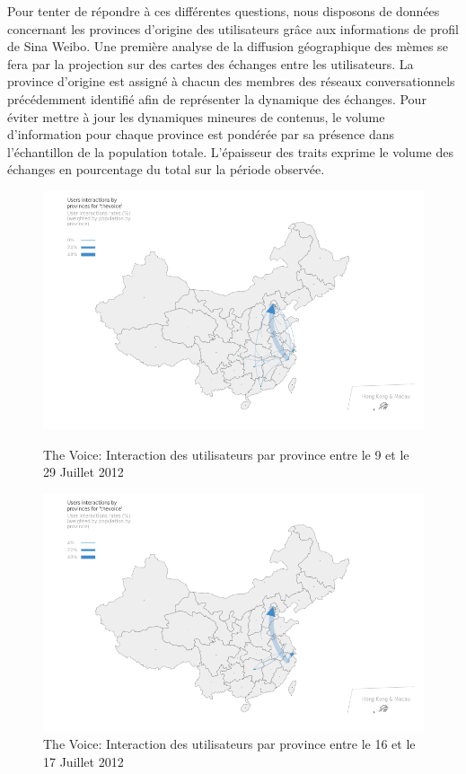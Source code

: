Pour tenter de répondre \`a ces différentes questions, nous disposons de données concernant les provinces d{\textquoteright}origine des utilisateurs grâce aux informations de profil de Sina Weibo. Une première analyse de la diffusion géographique des mèmes se fera par la projection sur des cartes des échanges entre les utilisateurs. La province d'origine est assigné à chacun des membres des réseaux conversationnels précédemment identifié afin de représenter la dynamique des échanges. Pour éviter mettre à jour les dynamiques mineures de contenus, le volume d'information pour chaque province est pondérée par sa présence dans l'échantillon de la population totale. L{\textquoteright}épaisseur des traits exprime le volume des échanges en pourcentage du total sur la période observée.

\begin{figure}[h!]
  \begin{minipage}[c]{.45\linewidth}
    \centering
    \includegraphics[scale=.3]{figures/chap4/chapitre4-img19.png}
    \caption{
      The Voice: Interaction des utilisateurs par province entre le 9 et le 29 Juillet 2012
    }
    \label{fig:geo-voice-t1}
  \end{minipage}
  \begin{minipage}[c]{.45\linewidth}
    \centering
    \includegraphics[scale=.3]{figures/chap4/chapitre4-img20.png}    
    \caption{
      The Voice: Interaction des utilisateurs par province entre le 16 et le 17 Juillet 2012
    }
    \label{fig:geo-voice-t2}
  \end{minipage}
\end{figure}

